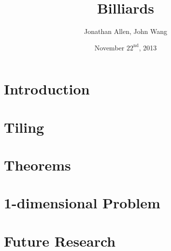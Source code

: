 \documentclass{beamer}
\title{Billiards}
\author{Jonathan Allen, John Wang}
\institute[MIT]{Massachusetts Institute of Technology}
\date{November $22^\text{nd}$, 2013}
\begin{document}
\graphicspath{ {figures/} }

\frame{

\titlepage

}

\section{Introduction}



\section{Tiling}

\frame{
  \tableofcontents[currentsection]
}



\section{Theorems}

\frame{
  \tableofcontents[currentsection]
}





\section{1-dimensional Problem}

\frame{
  \tableofcontents[currentsection]
}



\section{Future Research}

\frame{
  \tableofcontents[currentsection]
}


\end{document}
